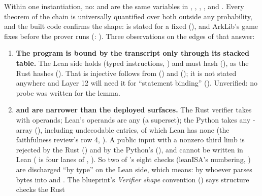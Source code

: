 Within one instantiation, no:  and  are the same variables in
, , ,
,  and .
Every theorem of the chain is universally quantified over both outside any probability, and the
built code confirms the shape: 
is stated for a fixed  (), and ArkLib's game fixes
 before the prover runs (:
). Three observations on the edges of that
answer:
\begin{enumerate}
\item \textbf{The program is bound by the transcript only through its stacked table.} The Lean
  side holds  (typed instructions, ) and
   must hash 
  (), as the Rust hashes 
  (). That  is
  injective follows from  () and
   (); it is not stated anywhere and
  Layer 12 will need it for \enquote{statement binding} ().
  Unverified: no probe was written for the lemma.
\item \textbf{ and  are narrower than the deployed surfaces.} The
  Rust verifier takes  with  operands; Lean's operands are any 
  (a superset); the Python takes any -array (), including
  undecodable entries, of which Lean has none (the faithfulness review's row 4,
  ). A public input with a nonzero third limb
  is rejected by the Rust () and by the Python's 
  (), and cannot be written in Lean ( is four lanes of
  , ). So two of 's eight checks (leanISA's
  numbering, ) are discharged \enquote{by type} on the Lean side,
  which means: by whoever parses bytes into  and . The
  blueprint's \emph{Verifier shape} convention () says structure checks the Rust

\end{enumerate}
